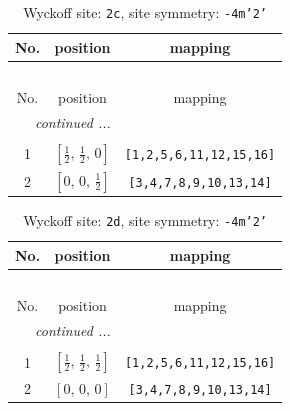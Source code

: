\documentclass[fleqn,8pt]{jsarticle}
\begin{document}
\renewcommand{\arraystretch}{1.2}
\begin{longtable}{ccc}
\caption{Wyckoff site: {\tt 2c}, site symmetry: {\tt -4m'2'}}
 \\
 \hline \hline
No. & position & mapping \\ \hline \endfirsthead

\multicolumn{2}{l}{\tablename\ \thetable{}} \\
 \hline \hline
No. & position & mapping \\ \hline \endhead

 \hline \hline
\multicolumn{2}{r}{\footnotesize\it continued ...} \\ \endfoot

 \hline \hline
\multicolumn{2}{r}{} \\ \endlastfoot

1 & $\left[ \frac{1}{2},\, \frac{1}{2},\, 0 \right]$ & {\tt [1,2,5,6,11,12,15,16]} \\ \hline
2 & $\left[ 0,\, 0,\, \frac{1}{2} \right]$ & {\tt [3,4,7,8,9,10,13,14]} \\
\end{longtable}
\renewcommand{\arraystretch}{1.2}
\begin{longtable}{ccc}
\caption{Wyckoff site: {\tt 2d}, site symmetry: {\tt -4m'2'}}
 \\
 \hline \hline
No. & position & mapping \\ \hline \endfirsthead

\multicolumn{2}{l}{\tablename\ \thetable{}} \\
 \hline \hline
No. & position & mapping \\ \hline \endhead

 \hline \hline
\multicolumn{2}{r}{\footnotesize\it continued ...} \\ \endfoot

 \hline \hline
\multicolumn{2}{r}{} \\ \endlastfoot

1 & $\left[ \frac{1}{2},\, \frac{1}{2},\, \frac{1}{2} \right]$ & {\tt [1,2,5,6,11,12,15,16]} \\ \hline
2 & $\left[ 0,\, 0,\, 0 \right]$ & {\tt [3,4,7,8,9,10,13,14]} \\
\end{longtable}
\renewcommand{\arraystretch}{1.2}
\end{document}
